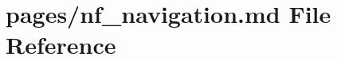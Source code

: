 \hypertarget{nf__navigation_8md}{}\section{pages/nf\+\_\+navigation.md File Reference}
\label{nf__navigation_8md}
